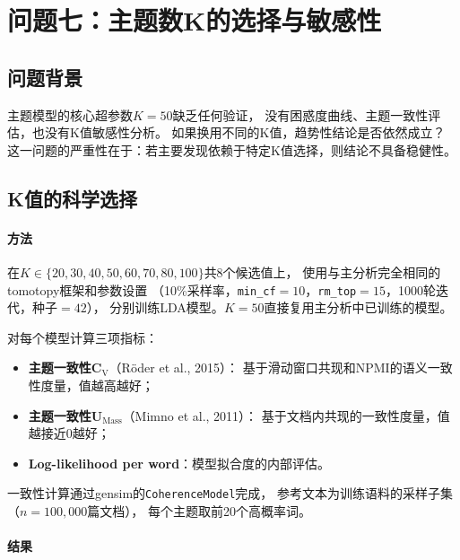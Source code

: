 \documentclass[12pt,a4paper]{ctexart}
\begin{document}
\section{问题七：主题数K的选择与敏感性}
\label{sec:k_robustness}

\subsection{问题背景}

主题模型的核心超参数$K=50$缺乏任何验证，
没有困惑度曲线、主题一致性评估，也没有K值敏感性分析。
如果换用不同的K值，趋势性结论是否依然成立？
这一问题的严重性在于：若主要发现依赖于特定K值选择，则结论不具备稳健性。

\subsection{K值的科学选择}

\paragraph{方法}
在$K \in \{20, 30, 40, 50, 60, 70, 80, 100\}$共8个候选值上，
使用与主分析完全相同的tomotopy框架和参数设置
（10\%采样率，\texttt{min\_cf}$=10$，\texttt{rm\_top}$=15$，1000轮迭代，种子$=42$），
分别训练LDA模型。$K=50$直接复用主分析中已训练的模型。

对每个模型计算三项指标：
\begin{itemize}
\item \textbf{主题一致性C$_\text{V}$}（Röder et al., 2015）：
      基于滑动窗口共现和NPMI的语义一致性度量，值越高越好；
\item \textbf{主题一致性U$_\text{Mass}$}（Mimno et al., 2011）：
      基于文档内共现的一致性度量，值越接近0越好；
\item \textbf{Log-likelihood per word}：模型拟合度的内部评估。
\end{itemize}

一致性计算通过gensim的\texttt{CoherenceModel}完成，
参考文本为训练语料的采样子集（$n=100{,}000$篇文档），
每个主题取前20个高概率词。

\paragraph{结果}
\end{document}
